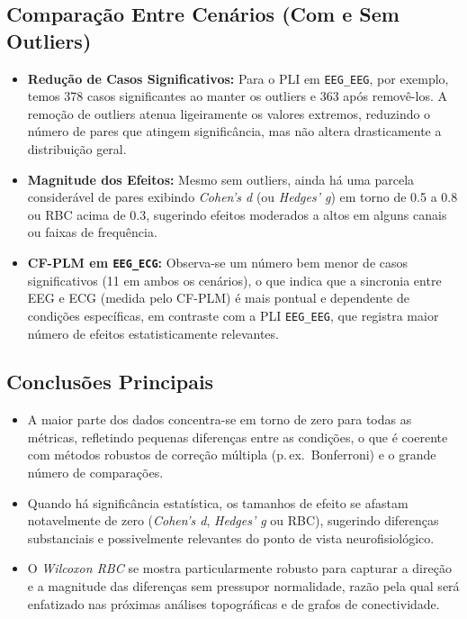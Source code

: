 \subsection{Comparação Entre Cenários (Com e Sem Outliers)}
\begin{itemize}
    \item \textbf{Redução de Casos Significativos:} Para o PLI em \texttt{EEG\_EEG}, por exemplo, temos 378 casos significantes ao manter os outliers e 363 após removê-los. A remoção de outliers atenua ligeiramente os valores extremos, reduzindo o número de pares que atingem significância, mas não altera drasticamente a distribuição geral.
    \item \textbf{Magnitude dos Efeitos:} Mesmo sem outliers, ainda há uma parcela considerável de pares exibindo \emph{Cohen's d} (ou \emph{Hedges' g}) em torno de 0.5 a 0.8 ou RBC acima de 0.3, sugerindo efeitos moderados a altos em alguns canais ou faixas de frequência.
    \item \textbf{CF-PLM em \texttt{EEG\_ECG}:} Observa-se um número bem menor de casos significativos (11 em ambos os cenários), o que indica que a sincronia entre EEG e ECG (medida pelo CF-PLM) é mais pontual e dependente de condições específicas, em contraste com a PLI \texttt{EEG\_EEG}, que registra maior número de efeitos estatisticamente relevantes.
\end{itemize}

\subsection{Conclusões Principais}
\begin{itemize}
    \item A maior parte dos dados concentra-se em torno de zero para todas as métricas, refletindo pequenas diferenças entre as condições, o que é coerente com métodos robustos de correção múltipla (p.\,ex.\ Bonferroni) e o grande número de comparações.
    \item Quando há significância estatística, os tamanhos de efeito se afastam notavelmente de zero (\emph{Cohen's d}, \emph{Hedges' g} ou RBC), sugerindo diferenças substanciais e possivelmente relevantes do ponto de vista neurofisiológico.
    \item O \emph{Wilcoxon RBC} se mostra particularmente robusto para capturar a direção e a magnitude das diferenças sem pressupor normalidade, razão pela qual será enfatizado nas próximas análises topográficas e de grafos de conectividade.
\end{itemize}

